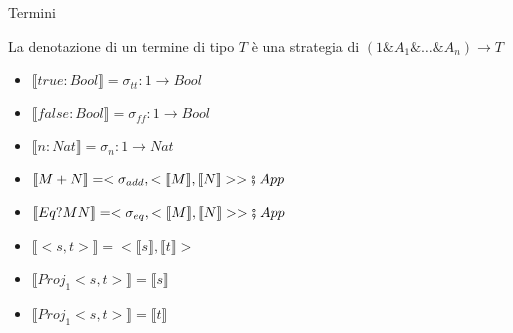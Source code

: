 \documentclass{beamer}
\begin{document}
\begin{frame}
	
	\begin{block}{Termini}
		
		\small
		
		La denotazione di un termine di tipo $T$ è una strategia di $(1\& A_1 \& \dots \& A_n)\rightarrow T$
		
		\begin{itemize}
			\item $\llbracket true : Bool \rrbracket = \sigma_{tt} : 1 \rightarrow Bool$
			\item $\llbracket false : Bool \rrbracket = \sigma_{ff} : 1 \rightarrow Bool$
			\item $\llbracket n : Nat \rrbracket = \sigma_n : 1 \rightarrow Nat$
			\item $\llbracket M + N \rrbracket = < \sigma_{add} , < \llbracket M \rrbracket , \llbracket N \rrbracket > > \fatsemi \; App$
			\item $\llbracket Eq? M N \rrbracket = < \sigma_{eq} , < \llbracket M \rrbracket , \llbracket N \rrbracket > > \fatsemi \; App$
			\item $\llbracket < s ,t > \rrbracket = <\llbracket s \rrbracket , \llbracket t \rrbracket>$
			\item $\llbracket Proj_1<s,t> \rrbracket = \llbracket s \rrbracket$
			\item $\llbracket Proj_1<s,t> \rrbracket = \llbracket t \rrbracket$
		\end{itemize}

	\end{block}

	
\end{frame}
\end{document}
